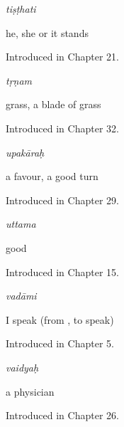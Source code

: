 \noindent\begin{minipage}[t]{\linewidth}
\raggedright
\textbf{}\enspace\emph{tiṣṭhati}\par
\small he, she or it stands\par
\footnotesize Introduced in Chapter 21.
\end{minipage}\par\medskip

\noindent\begin{minipage}[t]{\linewidth}
\raggedright
\textbf{}\enspace\emph{tṛṇam}\par
\small grass, a blade of grass\par
\footnotesize Introduced in Chapter 32.
\end{minipage}\par\medskip

\noindent\begin{minipage}[t]{\linewidth}
\raggedright
\textbf{}\enspace\emph{upakāraḥ}\par
\small a favour, a good turn\par
\footnotesize Introduced in Chapter 29.
\end{minipage}\par\medskip

\noindent\begin{minipage}[t]{\linewidth}
\raggedright
\textbf{}\enspace\emph{uttama}\par
\small good\par
\footnotesize Introduced in Chapter 15.
\end{minipage}\par\medskip

\noindent\begin{minipage}[t]{\linewidth}
\raggedright
\textbf{}\enspace\emph{vadāmi}\par
\small I speak (from , to speak)\par
\footnotesize Introduced in Chapter 5.
\end{minipage}\par\medskip

\noindent\begin{minipage}[t]{\linewidth}
\raggedright
\textbf{}\enspace\emph{vaidyaḥ}\par
\small a physician\par
\footnotesize Introduced in Chapter 26.
\end{minipage}\par\medskip


